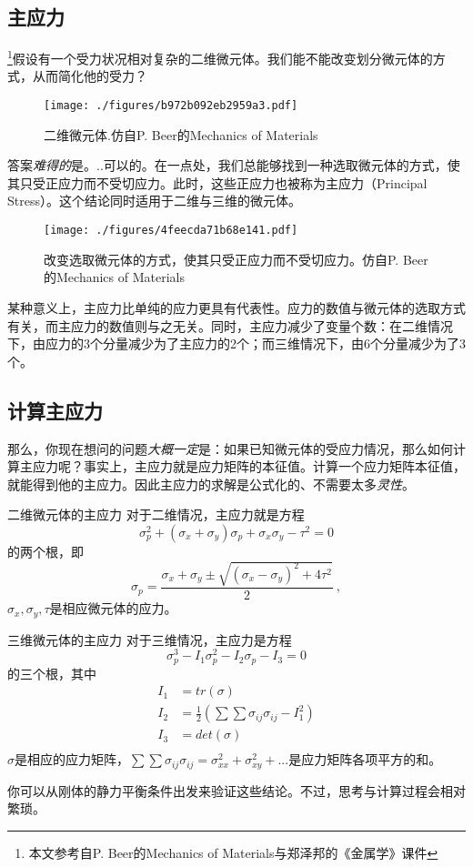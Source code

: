 

\subsection{主应力}
\footnote{本文参考自P. Beer的Mechanics of Materials与郑泽邦的《金属学》课件}假设有一个受力状况相对复杂的二维微元体。我们能不能改变划分微元体的方式，从而简化他的受力？
\begin{figure}[ht]
\centering
\texttt{[image: ./figures/b972b092eb2959a3.pdf]}
\caption{二维微元体.仿自P. Beer的Mechanics of Materials} \label{fig_PRSTR_1}
\end{figure}

答案\textsl{难得的}是。..可以的。在一点处，我们总能够找到一种选取微元体的方式，使其只受正应力而不受切应力。此时，这些正应力也被称为主应力（Principal Stress）。这个结论同时适用于二维与三维的微元体。
\begin{figure}[ht]
\centering
\texttt{[image: ./figures/4feecda71b68e141.pdf]}
\caption{改变选取微元体的方式，使其只受正应力而不受切应力。仿自P. Beer的Mechanics of Materials} \label{fig_PRSTR_2}
\end{figure}

某种意义上，主应力比单纯的应力更具有代表性。应力的数值与微元体的选取方式有关，而主应力的数值则与之无关。同时，主应力减少了变量个数：在二维情况下，由应力的3个分量减少为了主应力的2个；而三维情况下，由6个分量减少为了3个。

\subsection{计算主应力}

那么，你现在想问的问题\textsl{大概一定}是：如果已知微元体的受应力情况，那么如何计算主应力呢？事实上，主应力就是应力矩阵的本征值。计算一个应力矩阵本征值，就能得到他的主应力。因此主应力的求解是公式化的、不需要太多\textsl{灵性}。

\begin{example}{二维微元体的主应力}
对于二维情况，主应力就是方程
$$\sigma_p^2+(\sigma_x+\sigma_y)\sigma_p+\sigma_x\sigma_y-\tau^2=0$$
的两个根，即
$$\sigma_p=\frac{\sigma_x+\sigma_y \pm \sqrt{(\sigma_x-\sigma_y)^2+4\tau^2}}{2}~,$$
$\sigma_x,\sigma_y,\tau$是相应微元体的应力。
\end{example}

\begin{example}{三维微元体的主应力}
对于三维情况，主应力是方程 
$$
\sigma_p^3-I_1\sigma_p^2-I_2\sigma_p-I_3=0
$$
的三个根，其中
$$
\begin{aligned}
I_1&=tr(\sigma)\\
I_2&=\frac{1}{2} ({\sum \sum \sigma_{ij} \sigma_{ij} -I_1^2})\\
I_3&=det(\sigma)\\
\end{aligned}
$$
$\sigma$是相应的应力矩阵，$\sum \sum \sigma_{ij} \sigma_{ij}=\sigma_{xx}^2+\sigma_{xy}^2+...$是应力矩阵各项平方的和。
\end{example}
你可以从刚体的静力平衡条件出发来验证这些结论。不过，思考与计算过程会相对繁琐。

